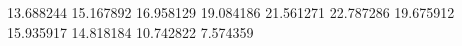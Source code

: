 13.688244
15.167892
16.958129
19.084186
21.561271
22.787286
19.675912
15.935917
14.818184
10.742822
7.574359
